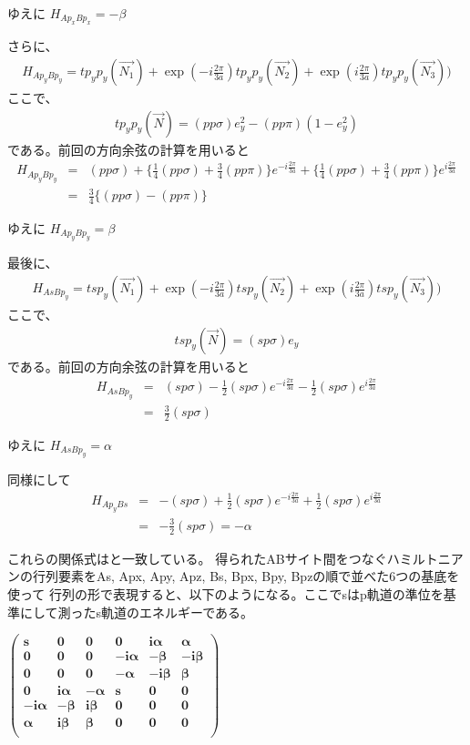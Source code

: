 \documentclass{article}
\begin{document}
ゆえに
$H_{Ap_x Bp_x}=-\beta$


さらに、
\begin{eqnarray}
H_{Ap_y Bp_y}=tp_yp_y(\vec{N_1})+\exp (-i\frac{2\pi}{3a})tp_yp_y(\vec{N_2})+\exp
(i\frac{2\pi}{3a})tp_yp_y(\vec{N_3}))
\end{eqnarray}
ここで、
\begin{eqnarray}
tp_yp_y(\vec{N})=(pp\sigma)e^2_y -(pp\pi)(1-e^2_y)
\end{eqnarray}
である。前回の方向余弦の計算を用いると
\begin{eqnarray}
H_{Ap_y Bp_y}&=&(pp\sigma)+\{ \frac{1}{4}(pp\sigma)+ \frac{3}{4}(pp\pi)\}e^{
-i\frac{2\pi}{3a}}+\{\frac{1}{4}
(pp\sigma)+\frac{3}{4}(pp\pi)\}e^{i\frac{2\pi}{3a}}  \nonumber \\
&=& \frac{3}{4}\{ (pp\sigma)-(pp\pi)\}
\end{eqnarray}

ゆえに
$H_{Ap_y Bp_y}=\beta$


最後に、
\begin{eqnarray}
H_{As Bp_y}=tsp_y(\vec{N_1})+\exp (-i\frac{2\pi}{3a})tsp_y(\vec{N_2})+\exp
(i\frac{2\pi}{3a})tsp_y(\vec{N_3}))
\end{eqnarray}
ここで、
\begin{eqnarray}
tsp_y(\vec{N})=(sp\sigma)e_y 
\end{eqnarray}
である。前回の方向余弦の計算を用いると
\begin{eqnarray}
H_{As Bp_y}&=&(sp\sigma)-\frac{1}{2}(sp\sigma)e^{
-i\frac{2\pi}{3a}}-\frac{1}{2}
(sp\sigma)e^{i\frac{2\pi}{3a}}  \nonumber \\
&=& \frac{3}{2}(sp\sigma)
\end{eqnarray}

ゆえに
$H_{As Bp_y}=\alpha$

同様にして
\begin{eqnarray}
H_{Ap_y Bs}&=&-(sp\sigma)+\frac{1}{2}(sp\sigma)e^{
-i\frac{2\pi}{3a}}+\frac{1}{2}
(sp\sigma)e^{i\frac{2\pi}{3a}}  \nonumber \\
&=& -\frac{3}{2}(sp\sigma) =-\alpha
\end{eqnarray}

これらの関係式は\cite{Hongki}と一致している。
得られたABサイト間をつなぐハミルトニアンの行列要素をAs, Apx, Apy, Apz, Bs, Bpx, Bpy, Bpzの順で並べた6つの基底を使って
行列の形で表現すると、以下のようになる。ここでsはp軌道の準位を基準にして測ったs軌道のエネルギーである。


\begin{doublespace}
\noindent\(\pmb{\left(
\begin{array}{cccccc}
 s & 0 & 0 & 0 & i \alpha  & \alpha  \\
 0 & 0 & 0 & -i \alpha  & -\beta  & -i \beta  \\
 0 & 0 & 0 & -\alpha  & -i \beta  & \beta  \\
 0 & i \alpha  & -\alpha  & s & 0 & 0 \\
 -i \alpha  & -\beta  & i \beta  & 0 & 0 & 0 \\
 \alpha  & i \beta  & \beta  & 0 & 0 & 0 \\
\end{array}
\right)}\)
\end{doublespace}
\end{document}
